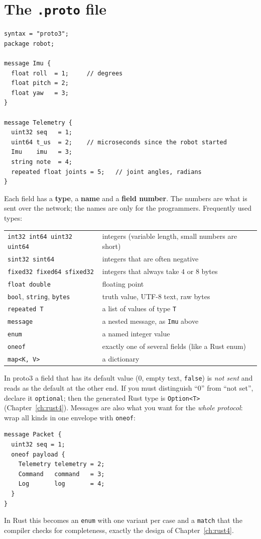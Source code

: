 \section*{The \texttt{.proto} file}
\begin{verbatim}
syntax = "proto3";
package robot;

message Imu {
  float roll  = 1;     // degrees
  float pitch = 2;
  float yaw   = 3;
}

message Telemetry {
  uint32 seq   = 1;
  uint64 t_us  = 2;    // microseconds since the robot started
  Imu    imu   = 3;
  string note  = 4;
  repeated float joints = 5;   // joint angles, radians
}
\end{verbatim}
Each field has a \textbf{type}, a \textbf{name} and a \textbf{field number}. The numbers are what is sent over the network; the names are only for the programmers. Frequently used types:
\begin{center}
\renewcommand{\arraystretch}{1.2}
\begin{tabular}{ll}
\verb!int32 int64 uint32 uint64! & integers (variable length, small numbers are short)\\
\verb!sint32 sint64! & integers that are often negative\\
\verb!fixed32 fixed64 sfixed32! & integers that always take $4$ or $8$ bytes\\
\verb!float double! & floating point\\
\verb!bool!, \verb!string!, \verb!bytes! & truth value, UTF-8 text, raw bytes\\
\verb!repeated T! & a list of values of type \verb!T!\\
\verb!message! & a nested message, as \verb!Imu! above\\
\verb!enum! & a named integer value\\
\verb!oneof! & exactly one of several fields (like a Rust enum)\\
\verb!map<K, V>! & a dictionary\\
\end{tabular}
\end{center}
In proto3 a field that has its default value ($0$, empty text, \verb!false!) is \emph{not sent} and reads as the default at the other end. If you must distinguish ``$0$'' from ``not set'', declare it \verb!optional!; then the generated Rust type is \verb!Option<T>! (Chapter~\ref{ch:rust4}). Messages are also what you want for the \emph{whole protocol}: wrap all kinds in one envelope with \verb!oneof!:
\begin{verbatim}
message Packet {
  uint32 seq = 1;
  oneof payload {
    Telemetry telemetry = 2;
    Command   command   = 3;
    Log       log       = 4;
  }
}
\end{verbatim}
In Rust this becomes an \verb!enum! with one variant per case and a \verb!match! that the compiler checks for completeness, exactly the design of Chapter~\ref{ch:rust4}.

